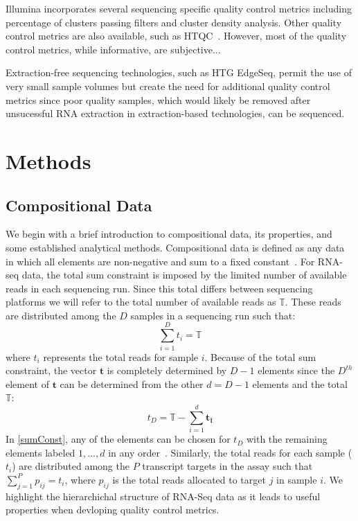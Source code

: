 \documentclass{article}\usepackage[]{graphicx}\usepackage[]{color}
\theoremstyle{definition}
\begin{document}
Illumina incorporates several sequencing specific quality control metrics including percentage of clusters passing filters and cluster density analysis. Other quality control metrics are also available, such as HTQC~\cite{Yang2013}.  However, most of the quality control metrics, while informative, are subjective...  %

Extraction-free sequencing technologies, such as HTG EdgeSeq, permit the use of very small sample volumes but create the need for additional quality control metrics since poor quality samples, which would likely be removed after unsucessful RNA extraction in extraction-based technologies, can be sequenced.\\ %

\section{Methods}

\subsection{Compositional Data}
We begin with a brief introduction to compositional data, its properties, and some established analytical methods.  Compositional data is defined as any data in which all elements are non-negative and sum to a fixed constant~\cite{Aitchison1986}. %
For RNA-seq data, the total sum constraint is imposed by the limited number of available reads in each sequencing run.  Since this total differs between sequencing platforms we will refer to the total number of available reads as $\mathbb{T}$. These reads are distributed among the $D$ samples in a sequencing run such that:
\begin{equation}
\sum_{i=1}^{D} t_i = \mathbb{T}
\label{sumt}
\end{equation}
where $t_i$ represents the total reads for sample $i$.  Because of the total sum constraint, the vector $\mathbf{t}$ is completely determined by $D-1$ elements since the $D^{th}$ element of $\mathbf{t}$ can be determined from the other $d = D-1$ elements and the total $\mathbb{T}$:  
\begin{equation}
t_D = \mathbb{T} - \sum_{i=1}^{d} \mathbf{t_i}
\label{sumConst}
\end{equation}
In \ref{sumConst}, any of the elements can be chosen for $t_D$ with the remaining elements labeled $1, ..., d$ in any order~\cite{Aitchison1986}.  Similarly, the total reads for each sample ($t_i$) are distributed among the $P$ transcript targets in the assay such that $\sum_{j=1}^{P} p_{ij} = t_i$, where $p_{ij}$ is the total reads allocated to target $j$ in sample $i$.  We highlight the hierarchichal structure of RNA-Seq data as it leads to useful properties when devloping quality control metrics.\\
\end{document}
